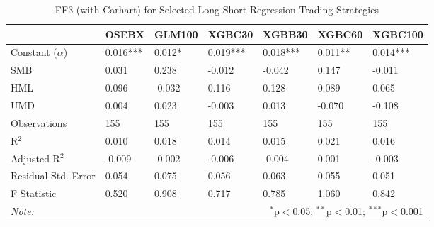 \begin{table}[!htbp] \centering 
  \caption{FF3 (with Carhart) for Selected Long-Short Regression Trading Strategies} 
  \vspace{1em}
  \label{table:trading-ff3-selected-long-short-part2} 
\begin{tabularx}{\textwidth}{lXXXXXX} 
\toprule
 & OSEBX & GLM100 & XGBC30 & XGBB30 & XGBC60 & XGBC100 \\ 
\midrule
Constant ($\alpha$) & 0.016*** & 0.012* & \cellcolor{lightlightgreen}0.019*** & 0.018*** & 0.011** & 0.014*** \\ 
SMB & 0.031 & 0.238 & -0.012 & -0.042 & 0.147 & -0.011 \\ 
HML & 0.096 & -0.032 & 0.116 & 0.128 & 0.089 & 0.065 \\ 
UMD & 0.004 & 0.023 & -0.003 & 0.013 & -0.070 & -0.108 \\ 
\midrule 
Observations & 155 & 155 & 155 & 155 & 155 & 155 \\ 
R$^{2}$ & 0.010 & 0.018 & 0.014 & 0.015 & 0.021 & 0.016 \\ 
Adjusted R$^{2}$ & -0.009 & -0.002 & -0.006 & -0.004 & 0.001 & -0.003 \\ 
Residual Std. Error & 0.054 & 0.075 & 0.056 & 0.063 & 0.055 & 0.051 \\ 
F Statistic & 0.520 & 0.908 & 0.717 & 0.785 & 1.060 & 0.842 \\ 
\bottomrule
\textit{Note:} & \multicolumn{6}{r}{$^{*}$p$<$0.05; $^{**}$p$<$0.01; $^{***}$p$<$0.001} \\ 
\end{tabularx} 
\end{table} 




